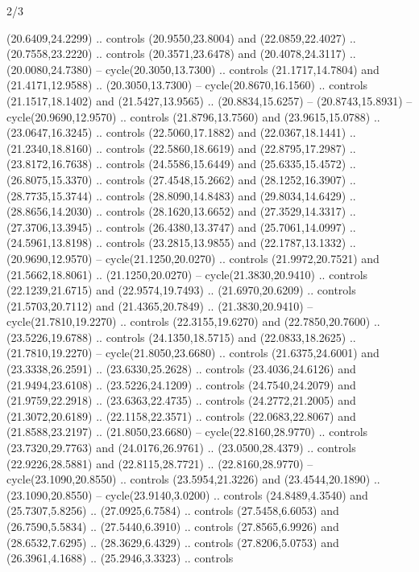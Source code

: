 \begin{flagdescription}{2/3}
\begin{scope}[yshift=\flagwidth,scale=\flagwidth/1241.93737]
\begin{scope}[y=-1mm, x=1mm,draw=gold,fill=blue,line join=miter,miter limit=4,line width=1.8\lw]
\begin{scope}[y=1mm, x=1mm, yscale=-1,shift={(573.68mm+\str,145.75)}]
\begin{scope}[scale=1.35,shift={(-9,-3)}]
\begin{scope}[scale=0.55]
\begin{scope}[scale=1.333]
    (20.6409,24.2299) .. controls (20.9550,23.8004) and (22.0859,22.4027) ..
    (20.7558,23.2220) .. controls (20.3571,23.6478) and (20.4078,24.3117) ..
    (20.0080,24.7380) -- cycle(20.3050,13.7300) .. controls (21.1717,14.7804) and
    (21.4171,12.9588) .. (20.3050,13.7300) -- cycle(20.8670,16.1560) .. controls
    (21.1517,18.1402) and (21.5427,13.9565) .. (20.8834,15.6257) --
    (20.8743,15.8931) -- cycle(20.9690,12.9570) .. controls (21.8796,13.7560) and
    (23.9615,15.0788) .. (23.0647,16.3245) .. controls (22.5060,17.1882) and
    (22.0367,18.1441) .. (21.2340,18.8160) .. controls (22.5860,18.6619) and
    (22.8795,17.2987) .. (23.8172,16.7638) .. controls (24.5586,15.6449) and
    (25.6335,15.4572) .. (26.8075,15.3370) .. controls (27.4548,15.2662) and
    (28.1252,16.3907) .. (28.7735,15.3744) .. controls (28.8090,14.8483) and
    (29.8034,14.6429) .. (28.8656,14.2030) .. controls (28.1620,13.6652) and
    (27.3529,14.3317) .. (27.3706,13.3945) .. controls (26.4380,13.3747) and
    (25.7061,14.0997) .. (24.5961,13.8198) .. controls (23.2815,13.9855) and
    (22.1787,13.1332) .. (20.9690,12.9570) -- cycle(21.1250,20.0270) .. controls
    (21.9972,20.7521) and (21.5662,18.8061) .. (21.1250,20.0270) --
    cycle(21.3830,20.9410) .. controls (22.1239,21.6715) and (22.9574,19.7493) ..
    (21.6970,20.6209) .. controls (21.5703,20.7112) and (21.4365,20.7849) ..
    (21.3830,20.9410) -- cycle(21.7810,19.2270) .. controls (22.3155,19.6270) and
    (22.7850,20.7600) .. (23.5226,19.6788) .. controls (24.1350,18.5715) and
    (22.0833,18.2625) .. (21.7810,19.2270) -- cycle(21.8050,23.6680) .. controls
    (21.6375,24.6001) and (23.3338,26.2591) .. (23.6330,25.2628) .. controls
    (23.4036,24.6126) and (21.9494,23.6108) .. (23.5226,24.1209) .. controls
    (24.7540,24.2079) and (21.9759,22.2918) .. (23.6363,22.4735) .. controls
    (24.2772,21.2005) and (21.3072,20.6189) .. (22.1158,22.3571) .. controls
    (22.0683,22.8067) and (21.8588,23.2197) .. (21.8050,23.6680) --
    cycle(22.8160,28.9770) .. controls (23.7320,29.7763) and (24.0176,26.9761) ..
    (23.0500,28.4379) .. controls (22.9226,28.5881) and (22.8115,28.7721) ..
    (22.8160,28.9770) -- cycle(23.1090,20.8550) .. controls (23.5954,21.3226) and
    (23.4544,20.1890) .. (23.1090,20.8550) -- cycle(23.9140,3.0200) .. controls
    (24.8489,4.3540) and (25.7307,5.8256) .. (27.0925,6.7584) .. controls
    (27.5458,6.6053) and (26.7590,5.5834) .. (27.5440,6.3910) .. controls
    (27.8565,6.9926) and (28.6532,7.6295) .. (28.3629,6.4329) .. controls
    (27.8206,5.0753) and (26.3961,4.1688) .. (25.2946,3.3323) .. controls

\end{scope}
\end{scope}
\end{scope}
\end{scope}
\end{scope}
\end{scope}
\end{flagdescription}
